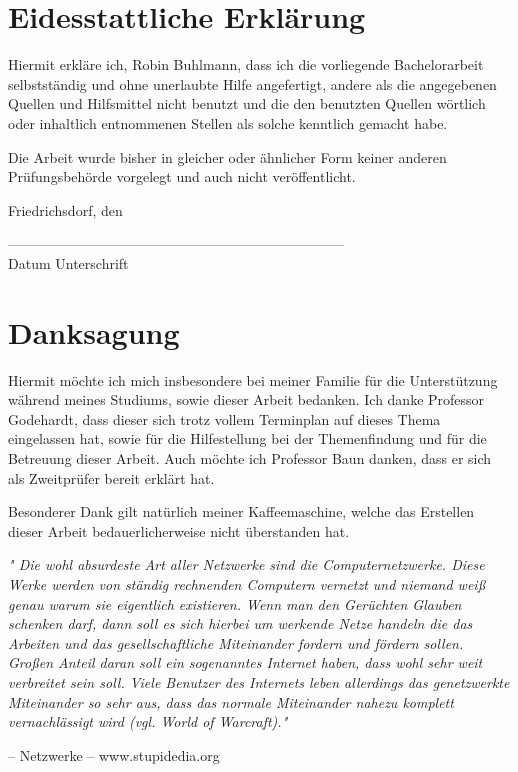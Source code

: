 \newpage
\chapter*{Eidesstattliche Erklärung}

Hiermit erkläre ich, Robin Buhlmann, dass ich die vorliegende Bachelorarbeit selbstständig und ohne unerlaubte Hilfe angefertigt, andere als die angegebenen Quellen und Hilfsmittel nicht benutzt und die den benutzten Quellen wörtlich oder inhaltlich entnommenen Stellen als solche kenntlich gemacht habe.

Die Arbeit wurde bisher in gleicher oder ähnlicher Form keiner anderen Prüfungsbehörde vorgelegt und auch nicht veröffentlicht.


\vspace{1cm}

Friedrichsdorf, den

\vspace{1cm}

------------------------------------\hspace{6cm}------------------------------------\\
Datum \hspace{9,4cm} Unterschrift

\newpage

\chapter*{Danksagung}
\setlength{\parindent}{0em}
\setlength{\parskip}{1em}

Hiermit möchte ich mich insbesondere bei meiner Familie für die Unterstützung während meines Studiums, sowie dieser Arbeit bedanken. Ich danke Professor Godehardt, dass dieser sich trotz vollem Terminplan auf dieses Thema eingelassen hat, sowie für die Hilfestellung bei der Themenfindung und für die Betreuung dieser Arbeit. Auch möchte ich Professor Baun danken, dass er sich als Zweitprüfer bereit erklärt hat.\par

Besonderer Dank gilt natürlich meiner Kaffeemaschine, welche das Erstellen dieser Arbeit bedauerlicherweise nicht überstanden hat.\par

\begin{displayquote} 
\textit{"
Die wohl absurdeste Art aller Netzwerke sind die Computernetzwerke. Diese Werke werden von ständig rechnenden Computern vernetzt und niemand weiß genau warum sie eigentlich existieren. Wenn man den Gerüchten Glauben schenken darf, dann soll es sich hierbei um werkende Netze handeln die das Arbeiten und das gesellschaftliche Miteinander fordern und fördern sollen. Großen Anteil daran soll ein sogenanntes Internet haben, dass wohl sehr weit verbreitet sein soll. Viele Benutzer des Internets leben allerdings das genetzwerkte Miteinander so sehr aus, dass das normale Miteinander nahezu komplett vernachlässigt wird (vgl. World of Warcraft)."}\par
\hfill
 -- Netzwerke -- www.stupidedia.org
\end{displayquote}

